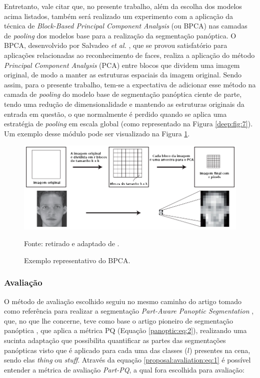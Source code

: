 Entretanto, vale citar que, no presente trabalho, além da escolha dos modelos acima listados, também será realizado um experimento com a aplicação da técnica de \textit{Block-Based Principal Component Analysis} (ou BPCA) nas camadas de \textit{pooling} dos modelos base para a realização da segmentação panóptica. O BPCA, desenvolvido por Salvadeo \textit{et al.} \cite{Salvadeo2011}, que se provou satisfatório para aplicações relacionadas ao reconhecimento de faces, realiza a aplicação do método \textit{Principal Component Analysis} (PCA) entre blocos que dividem uma imagem original, de modo a manter as estruturas espaciais da imagem original. Sendo assim, para o presente trabalho, tem-se a expectativa de adicionar esse método na camada de \textit{pooling} do modelo base  de segmentação panóptica ciente de parte, tendo uma redução de dimensionalidade e mantendo as estruturas originais da entrada em questão, o que normalmente é perdido quando se aplica uma estratégia de \textit{pooling} em escala global (como representado na Figura \ref{deep:fig:7}).  Um exemplo desse módulo pode ser visualizado na Figura \ref{proposal:pcapooling:fig:3}.

\begin{figure}[H]
    \centering
    \caption{Exemplo representativo do BPCA.}
    \includegraphics[width=1\textwidth]{recursos/imagens/proposal/BPCA.png}
    \label{proposal:pcapooling:fig:3}

    Fonte: retirado e adaptado de \cite{Salvadeo2011}.
\end{figure}


\subsubsection{Avaliação}
\label{proposal:avaliation}
O método de avaliação escolhido seguiu no mesmo caminho do artigo tomado como referência para realizar a segmentação \textit{Part-Aware Panoptic Segmentation} \cite{DeGeus2021}, que, no que lhe concerne, teve como base o artigo pioneiro de segmentação panóptica \cite{Kirillov2019a}, que aplica a métrica PQ (Equação \ref{panoptic:eq:2}), realizando uma sucinta adaptação que possibilita quantificar as partes das segmentações panópticas visto que é aplicado para cada uma das classes ($l$) presentes na cena, sendo elas \textit{thing} ou \textit{stuff}. Através da equação \ref{proposal:avaliation:eq:1} é possível entender a métrica de avaliação \textit{Part-PQ}, a qual fora escolhida para avaliação:

